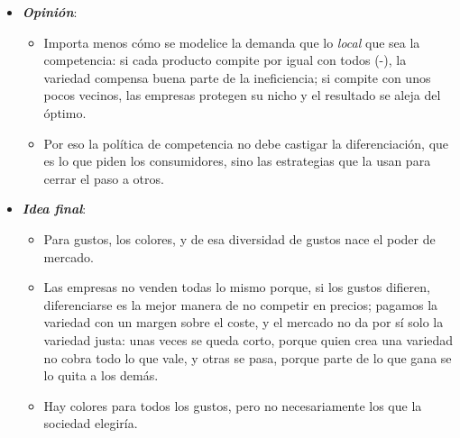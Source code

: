 \documentclass[11pt]{article}
\begin{document}
\begin{itemize}
\begin{itemize}
  \item las herramientas de la teoría de juegos ;
  \item las barreras de entrada ;
  \item la definición del mercado relevante ;
  \item la publicidad como señal ;
  \item la variedad óptima como problema de segundo óptimo ;
  \item y la estimación de demandas de productos diferenciados con modelos de elección discreta (anexo~\ref{anexo:empirica}).
  \end{itemize}
\item \textbf{\emph{Opinión}}:
  \begin{itemize}
  \item Importa menos cómo se modelice la demanda que lo \emph{local} que sea la competencia: si cada producto compite por igual con todos (-), la variedad compensa buena parte de la ineficiencia; si compite con unos pocos vecinos, las empresas protegen su nicho y el resultado se aleja del óptimo.
  \item Por eso la política de competencia no debe castigar la diferenciación, que es lo que piden los consumidores, sino las estrategias que la usan para cerrar el paso a otros.
  \end{itemize}
\item \textbf{\emph{Idea final}}:
  \begin{itemize}
  \item Para gustos, los colores, y de esa diversidad de gustos nace el poder de mercado.

  \item Las empresas no venden todas lo mismo porque, si los gustos difieren, diferenciarse es la mejor manera de no competir en precios; pagamos la variedad con un margen sobre el coste, y el mercado no da por sí solo la variedad justa: unas veces se queda corto, porque quien crea una variedad no cobra todo lo que vale, y otras se pasa, porque parte de lo que gana se lo quita a los demás.

  \item Hay colores para todos los gustos, pero no necesariamente los que la sociedad elegiría.
  \end{itemize}
\end{itemize}

\clearpage
\appendix
\end{document}
